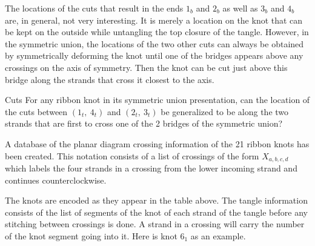 \begin{paper}
The locations of the cuts that result in the ends $1_b$ and $2_b$ as well as
$3_b$ and $4_b$ are, in general, not very interesting.
It is merely a location on the knot that can be kept on the outside while
untangling the top closure of the tangle.
However, in the symmetric union, the locations of the two other cuts can always
be obtained by symmetrically deforming the knot until one of the bridges appears
above any crossings on the axis of symmetry.
Then the knot can be cut just above this bridge along the strands that cross it
closest to the axis.

\newsavebox{\mirrorR}



\begin{paperqtn}{Cuts}
For any ribbon knot in its symmetric union presentation, can the location of the
cuts between $(1_t,~4_t)$ and $(2_t,~3_t)$ be generalized to be along the
two strands that are first to cross one of the 2 bridges of the symmetric union?
\end{paperqtn}


A database of the planar diagram crossing information of the 21 ribbon
knots has been created.
This notation consists of a list of crossings of the form $X_{a,b,c,d}$ which
labels the four strands in a crossing from the lower incoming strand and
continues counterclockwise.

\begin{center}\end{center}


The knots are encoded as they appear in the table above.
The tangle information consists of the list of segments of the knot of each
strand of the tangle before any stitching between crossings is done.
A strand in a crossing will carry the number of the knot segment going into it.
Here is knot $6_1$ as an example.


\end{paper}
